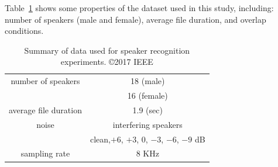 Table~\ref{tab:ch2_data_summary} shows some properties of the dataset used in this study, including: number of speakers (male and female), average file duration, and overlap conditions. 

\begin{table}[h!]
	\begin{center}
		\caption{ Summary of data used for speaker recognition experiments. \copyright 2017 IEEE}
		\begin{tabular}{| c | c |}
			\hline
			\hline
			number of speakers	& 18 (male)  \\
			\hspace{4mm}			&  16 (female) \\
			\hline
			average file duration	&   1.9 (sec) \\ 
			\hline
			noise				& interfering speakers \\
			\hspace{4mm}			& clean,$+6$, $+3$, $0$, $-3$, $-6$, $-9$ dB \\
			\hline
			sampling rate			& $8$ KHz \\
			\hline
			\hline	
		\end{tabular}
		\label{tab:ch2_data_summary}
	\end{center}
\end{table}

